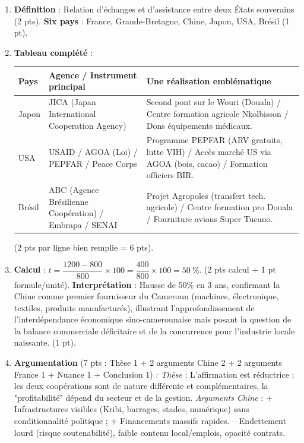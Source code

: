 \documentclass[11pt]{article}
\begin{document}
\begin{corrige}
\begin{enumerate}
\item \textbf{Définition} : Relation d'échanges et d'assistance entre deux États souverains (2 pts). \textbf{Six pays} : France, Grande-Bretagne, Chine, Japon, USA, Brésil (1 pt).
\item \textbf{Tableau complété} :
\begin{center}
\begin{tabularx}{\linewidth}{|l|X|X|}
\hline
\rowcolor{popblueL} \textbf{Pays} & \textbf{Agence / Instrument principal} & \textbf{Une réalisation emblématique} \\
\hline
Japon & JICA (Japan International Cooperation Agency) & Second pont sur le Wouri (Douala) / Centre formation agricole Nkolbisson / Dons équipements médicaux. \\
\hline
USA & USAID / AGOA (Loi) / PEPFAR / Peace Corps & Programme PEPFAR (ARV gratuits, lutte VIH) / Accès marché US via AGOA (bois, cacao) / Formation officiers BIR. \\
\hline
Brésil & ABC (Agence Brésilienne Coopération) / Embrapa / SENAI & Projet Agropoles (transfert tech. agricole) / Centre formation pro Douala / Fourniture avions Super Tucano. \\
\hline
\end{tabularx}
\end{center}
(2 pts par ligne bien remplie = 6 pts).
\item \textbf{Calcul} : $t = \dfrac{1200 - 800}{800} \times 100 = \dfrac{400}{800} \times 100 = 50~\%$. (2 pts calcul + 1 pt formule/unité).
\textbf{Interprétation} : Hausse de 50\% en 3 ans, confirmant la Chine comme premier fournisseur du Cameroun (machines, électronique, textiles, produits manufacturés), illustrant l'approfondissement de l'interdépendance économique sino-camerounaise mais posant la question de la balance commerciale déficitaire et de la concurrence pour l'industrie locale naissante. (1 pt).
\item \textbf{Argumentation} (7 pts : Thèse 1 + 2 arguments Chine 2 + 2 arguments France 1 + Nuance 1 + Conclusion 1) :
\textit{Thèse} : L'affirmation est réductrice ; les deux coopérations sont de nature différente et complémentaires, la "profitabilité" dépend du secteur et de la gestion.
\textit{Arguments Chine} : + Infrastructures visibles (Kribi, barrages, stades, numérique) sans conditionnalité politique ; + Financements massifs rapides. -- Endettement lourd (risque soutenabilité), faible contenu local/emplois, opacité contrats.

\end{enumerate}
\end{corrige}
\end{document}
